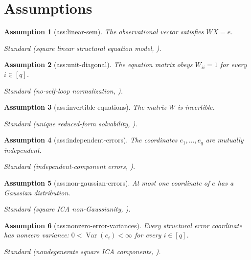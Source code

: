 \documentclass{article}
\newtheorem{assumption}{Assumption}
\begin{document}
\section{Assumptions}

\begin{assumption}[ass:linear-sem]\label{ass:linear-sem}
The observational vector satisfies \(WX=e\).
\par\smallskip\noindent\emph{Standard} (square linear structural equation model, \cite{LacerdaSpirtesRamseyHoyer2008}).
\end{assumption}

\begin{assumption}[ass:unit-diagonal]\label{ass:unit-diagonal}
The equation matrix obeys \(W_{ii}=1\) for every \(i\in[q]\).
\par\smallskip\noindent\emph{Standard} (no-self-loop normalization, \cite{LacerdaSpirtesRamseyHoyer2008}).
\end{assumption}

\begin{assumption}[ass:invertible-equations]\label{ass:invertible-equations}
The matrix \(W\) is invertible.
\par\smallskip\noindent\emph{Standard} (unique reduced-form solvability, \cite{LacerdaSpirtesRamseyHoyer2008}).
\end{assumption}

\begin{assumption}[ass:independent-errors]\label{ass:independent-errors}
The coordinates \(e_1,\ldots,e_q\) are mutually independent.
\par\smallskip\noindent\emph{Standard} (independent-component errors, \cite{LacerdaSpirtesRamseyHoyer2008}).
\end{assumption}

\begin{assumption}[ass:non-gaussian-errors]\label{ass:non-gaussian-errors}
At most one coordinate of \(e\) has a Gaussian distribution.
\par\smallskip\noindent\emph{Standard} (square ICA non-Gaussianity, \cite{LacerdaSpirtesRamseyHoyer2008}).
\end{assumption}

\begin{assumption}[ass:nonzero-error-variances]\label{ass:nonzero-error-variances}
Every structural error coordinate has nonzero variance: \(0<\operatorname{Var}(e_i)<\infty\) for every \(i\in[q]\).
\par\smallskip\noindent\emph{Standard} (nondegenerate square ICA components, \cite{LacerdaSpirtesRamseyHoyer2008}).
\end{assumption}
\end{document}
